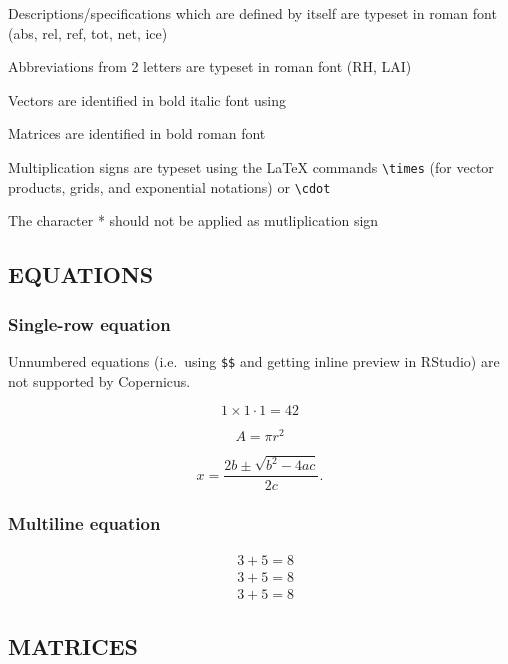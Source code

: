 \documentclass[gc, manuscript, english]{copernicus}
\begin{document}
Descriptions/specifications which are defined by itself are typeset in
roman font (abs, rel, ref, tot, net, ice)

Abbreviations from 2 letters are typeset in roman font (RH, LAI)

Vectors are identified in bold italic font using 

Matrices are identified in bold roman font

Multiplication signs are typeset using the LaTeX commands
\texttt{\textbackslash{}times} (for vector products, grids, and
exponential notations) or \texttt{\textbackslash{}cdot}

The character * should not be applied as mutliplication sign

\subsection{EQUATIONS}

\subsubsection{Single-row equation}

Unnumbered equations (i.e.~using \texttt{\$\$} and getting inline
preview in RStudio) are not supported by Copernicus.

\begin{equation}
1 \times 1 \cdot 1 = 42
\end{equation}

\begin{equation}
A = \pi r^2
\end{equation}

\begin{equation}
x=\frac{2b\pm\sqrt{b^{2}-4ac}}{2c}.  
\end{equation}

\subsubsection{Multiline equation}

\begin{align}
& 3 + 5 = 8\\
& 3 + 5 = 8\\
& 3 + 5 = 8
\end{align}

\subsection{MATRICES}
\end{document}
